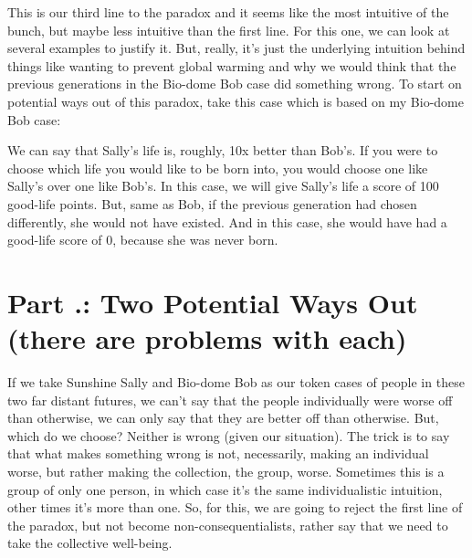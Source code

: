 This is our third line to the paradox and it seems like the most intuitive of the bunch, but maybe less intuitive than the first line. For this one, we can look at several examples to justify it. But, really, it's just the underlying intuition behind things like wanting to prevent global warming and why we would think that the previous generations in the Bio-dome Bob case did something wrong. To start on potential ways out of this paradox, take this case which is based on my Bio-dome Bob case:


We can say that Sally's life is, roughly, 10x better than Bob's. If you were to choose which life you would like to be born into, you would choose one like Sally's over one like Bob's. In this case, we will give Sally's life a score of 100 good-life points. But, same as Bob, if the previous generation had chosen differently, she would not have existed. And in this case, she would have had a good-life score of 0, because she was never born. 

\section{Part \thechapcount.\theseccount: Two Potential Ways Out (there are problems with each)}

If we take Sunshine Sally and Bio-dome Bob as our token cases of people in these two far distant futures, we can’t say that the people individually were worse off than otherwise, we can only say that they are better off than otherwise. But, which do we choose? Neither is wrong (given our situation). The trick is to say that what makes something wrong is not, necessarily, making an individual worse, but rather making the collection, the group, worse. Sometimes this is a group of only one person, in which case it’s the same individualistic intuition, other times it’s more than one. So, for this, we are going to reject the first line of the paradox, but not become non-consequentialists, rather say that we need to take the collective well-being. 

